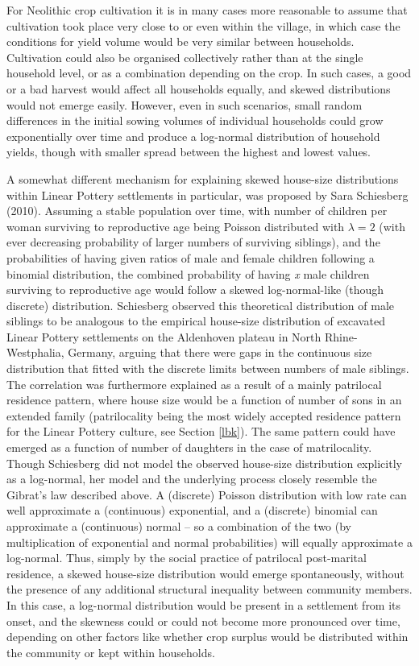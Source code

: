 \documentclass[
  12pt,
  a4paper, twoside]{book}
\begin{document}
For Neolithic crop cultivation it is in many cases more reasonable to assume that cultivation took place very close to or even within the village, in which case the conditions for yield volume would be very similar between households. Cultivation could also be organised collectively rather than at the single household level, or as a combination depending on the crop. In such cases, a good or a bad harvest would affect all households equally, and skewed distributions would not emerge easily. However, even in such scenarios, small random differences in the initial sowing volumes of individual households could grow exponentially over time and produce a log-normal distribution of household yields, though with smaller spread between the highest and lowest values.

A somewhat different mechanism for explaining skewed house-size distributions within Linear Pottery settlements in particular, was proposed by Sara Schiesberg (2010). Assuming a stable population over time, with number of children per woman surviving to reproductive age being Poisson distributed with \(\lambda = 2\) (with ever decreasing probability of larger numbers of surviving siblings), and the probabilities of having given ratios of male and female children following a binomial distribution, the combined probability of having \emph{x} male children surviving to reproductive age would follow a skewed log-normal-like (though discrete) distribution. Schiesberg observed this theoretical distribution of male siblings to be analogous to the empirical house-size distribution of excavated Linear Pottery settlements on the Aldenhoven plateau in North Rhine-Westphalia, Germany, arguing that there were gaps in the continuous size distribution that fitted with the discrete limits between numbers of male siblings. The correlation was furthermore explained as a result of a mainly patrilocal residence pattern, where house size would be a function of number of sons in an extended family (patrilocality being the most widely accepted residence pattern for the Linear Pottery culture, see Section \ref{lbk}). The same pattern could have emerged as a function of number of daughters in the case of matrilocality. Though Schiesberg did not model the observed house-size distribution explicitly as a log-normal, her model and the underlying process closely resemble the Gibrat's law described above. A (discrete) Poisson distribution with low rate can well approximate a (continuous) exponential, and a (discrete) binomial can approximate a (continuous) normal -- so a combination of the two (by multiplication of exponential and normal probabilities) will equally approximate a log-normal. Thus, simply by the social practice of patrilocal post-marital residence, a skewed house-size distribution would emerge spontaneously, without the presence of any additional structural inequality between community members. In this case, a log-normal distribution would be present in a settlement from its onset, and the skewness could or could not become more pronounced over time, depending on other factors like whether crop surplus would be distributed within the community or kept within households.
\end{document}
